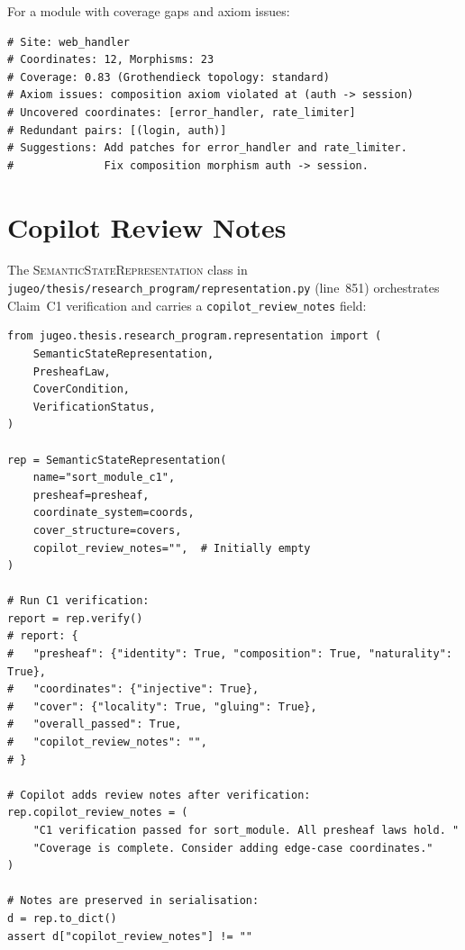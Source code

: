 \documentclass[11pt]{article}
\newcommand{\CopRevNotes}{\texttt{copilot\_review\_notes}}
\newcommand{\SemState}{\textsc{SemanticStateRepresentation}}
\begin{document}
\begin{example}\label{ex:degraded}
For a module with coverage gaps and axiom issues:
\begin{lstlisting}[style=jugeo-python]
# Site: web_handler
# Coordinates: 12, Morphisms: 23
# Coverage: 0.83 (Grothendieck topology: standard)
# Axiom issues: composition axiom violated at (auth -> session)
# Uncovered coordinates: [error_handler, rate_limiter]
# Redundant pairs: [(login, auth)]
# Suggestions: Add patches for error_handler and rate_limiter.
#              Fix composition morphism auth -> session.
\end{lstlisting}
\end{example}

\section{Copilot Review Notes}\label{sec:review-notes}

The \SemState{} class in
\texttt{jugeo/thesis/research\_program/representation.py} (line~851)
orchestrates Claim~C1 verification and carries a \CopRevNotes{} field:

\begin{lstlisting}[style=jugeo-python]
from jugeo.thesis.research_program.representation import (
    SemanticStateRepresentation,
    PresheafLaw,
    CoverCondition,
    VerificationStatus,
)

rep = SemanticStateRepresentation(
    name="sort_module_c1",
    presheaf=presheaf,
    coordinate_system=coords,
    cover_structure=covers,
    copilot_review_notes="",  # Initially empty
)

# Run C1 verification:
report = rep.verify()
# report: {
#   "presheaf": {"identity": True, "composition": True, "naturality": True},
#   "coordinates": {"injective": True},
#   "cover": {"locality": True, "gluing": True},
#   "overall_passed": True,
#   "copilot_review_notes": "",
# }

# Copilot adds review notes after verification:
rep.copilot_review_notes = (
    "C1 verification passed for sort_module. All presheaf laws hold. "
    "Coverage is complete. Consider adding edge-case coordinates."
)

# Notes are preserved in serialisation:
d = rep.to_dict()
assert d["copilot_review_notes"] != ""
\end{lstlisting}
\end{document}

